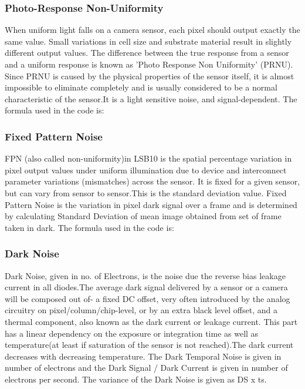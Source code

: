 \documentclass[../../main.tex]{subfiles}
\begin{document}
\subsubsection{Photo-Response Non-Uniformity} %
When uniform light falls on a camera sensor, each pixel should output exactly the same value. Small variations in cell size and substrate material result in slightly different output values. The difference between the true response from a sensor and a uniform response is known as 'Photo Response Non Uniformity' (PRNU).
Since PRNU is caused by the physical properties of the sensor itself, it is almost impossible to eliminate completely and is usually considered to be a normal characteristic of the sensor.It is a light sensitive noise, and signal-dependent.
The formula used in the code is:


\subsubsection{Fixed Pattern Noise} %
FPN (also called non-uniformity)in LSB10 is the spatial percentage variation in pixel output values under uniform illumination due to device and interconnect parameter variations (mismatches) across the sensor. It is fixed for a given sensor, but can vary from sensor to sensor.This is the standard deviation value.
Fixed Pattern Noise is the variation in pixel dark signal over a frame and is determined by calculating Standard Deviation of mean image obtained from set of frame taken in dark.
The formula used in the code is:


\subsubsection{Dark Noise} %
Dark Noise, given in no. of Electrons, is the noise due the reverse bias leakage current in
all diodes.The average dark signal delivered by a sensor or a camera will be composed out of- a fixed DC offset, very often introduced by the analog circuitry on pixel/column/chip-level, or by an
extra black level offset, and a thermal component, also known as the dark current or leakage current. This part has a linear dependency on the exposure or integration time as well as temperature(at least if saturation of the sensor is not reached).The dark current decreases with decreasing temperature.
The Dark Temporal Noise is given in number of electrons and the Dark Signal / Dark Current is
given in number of electrons per second. The variance of the Dark Noise is given as DS x ts.
\end{document}
